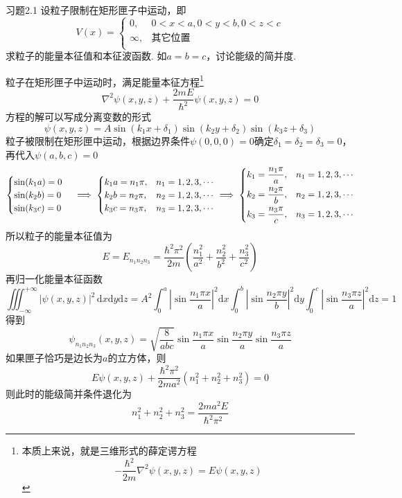 \begin{question}{习题2.1}
    设粒子限制在矩形匣子中运动，即
    $$
        V(x) = \begin{cases}
            0,      & 0<x<a, 0<y<b, 0<z<c \\
            \infty, & \text{其它位置}         \\
        \end{cases}
    $$
    求粒子的能量本征值和本征波函数. 如$a=b=c$，讨论能级的简并度.
\end{question}
\begin{solution}
    粒子在矩形匣子中运动时，满足能量本征方程\footnote{本质上来说，就是三维形式的薛定谔方程$$-\frac{\hbar^2}{2m}\nabla^2\psi(x,y,z)=E\psi(x,y,z)$$}
    $$
        \nabla^2\psi(x,y,z) + \frac{2mE}{\hbar^2}\psi(x,y,z)= 0
    $$
    方程的解可以写成分离变数的形式
    $$
        \psi(x,y,z)=A\sin(k_1x+\delta_1)\sin(k_2y+\delta_2)\sin(k_3z+\delta_3)
    $$
    粒子被限制在矩形匣中运动，根据边界条件$\psi(0,0,0)=0$确定$\delta_1=\delta_2=\delta_3=0$，再代入$\psi(a,b,c)=0$
    $$
        \begin{cases}
            \sin(k_1a)=0 \\
            \sin(k_2b)=0 \\
            \sin(k_3c)=0 \\
        \end{cases}
        \implies
        \begin{cases}
            k_1a = n_1\pi, & n_1=1,2,3,\cdots \\
            k_2b = n_2\pi, & n_2=1,2,3,\cdots \\
            k_3c = n_3\pi, & n_3=1,2,3,\cdots \\
        \end{cases}
        \implies
        \begin{dcases}
            k_1=\frac{n_1\pi}{a}, & n_1=1,2,3,\cdots \\
            k_2=\frac{n_2\pi}{b}, & n_2=1,2,3,\cdots \\
            k_3=\frac{n_3\pi}{c}, & n_3=1,2,3,\cdots \\
        \end{dcases}
    $$
    所以粒子的能量本征值为
    $$
        E=E_{n_1n_2n_3}=\frac{\hbar^2\pi^2}{2m}\left(\frac{n_1^2}{a^2}+\frac{n_2^2}{b^2}+\frac{n_3^2}{c^2}\right)
    $$
    再归一化能量本征函数
    $$
        \iiint_{-\infty}^{+\infty}|\psi(x,y,z)|^2\,\mathrm{d}x\mathrm{d}y\mathrm{d}z
        =A^2\int_{0}^{a}\left|\sin\frac{n_1\pi x}{a}\right|^2\mathrm{d}x
        \int_{0}^{b}\left|\sin\frac{n_2\pi y}{b}\right|^2\mathrm{d}y
        \int_{0}^{c}\left|\sin\frac{n_3\pi z}{a}\right|^2\mathrm{d}z
        =1
    $$
    得到
    $$
        \psi_{n_1n_2n_3}(x,y,z) = \sqrt{\frac{8}{abc}}\sin\frac{n_1\pi x}{a}\sin\frac{n_2\pi y}{a}\sin\frac{n_3\pi z}{a}
    $$
    如果匣子恰巧是边长为$a$的立方体，则
    $$
        E\psi(x,y,z) + \frac{\hbar^2\pi^2}{2ma^2}\left(n_1^2+n_2^2+n_3^2\right) = 0
    $$
    则此时的能级简并条件退化为
    $$
        n_1^2+n_2^2+n_3^2 = \frac{2ma^2E}{\hbar^2\pi^2}
    $$
\end{solution}




